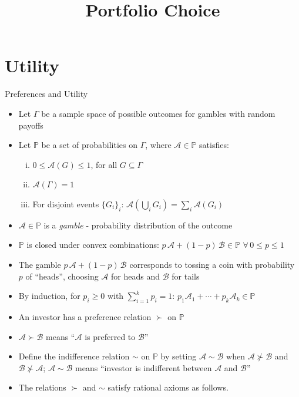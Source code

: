 \documentclass[10pt]{beamer}
\title{Portfolio Choice}
\author{}
\date{}
\theoremstyle{definition}
\begin{document}
\begin{frame}
\titlepage
\end{frame}


\section{Utility}

\begin{frame}{Preferences and Utility}
  \begin{itemize}[<+->]
    \item Let $\Gamma$ be a sample space of possible outcomes for gambles with random payoffs
    \item Let $\mathbb{P}$ be a set of probabilities on $\Gamma$, where $\mathcal{A} \in \mathbb{P}$ satisfies:
      \begin{enumerate}[(i)]
        \item $0 \leqslant \mathcal{A}(G) \leqslant 1$, for all $G \subseteq \Gamma$
        \item $\mathcal{A}(\Gamma) = 1$
        \item For disjoint events $\{G_i\}_i$: $\mathcal{A}\left(\bigcup_i G_i\right) = \sum_i \mathcal{A}(G_i)$
      \end{enumerate}
    \item $\mathcal{A} \in \mathbb{P}$ is a \emph{gamble} - probability distribution of the outcome
    \item $\mathbb{P}$ is closed under convex combinations: $p\,\mathcal{A} + (1-p)\,\mathcal{B} \in \mathbb{P}$ $\forall\,0 \leqslant p \leqslant 1$
    \item The gamble $p\,\mathcal{A} + (1-p)\,\mathcal{B}$ corresponds to tossing a coin with probability $p$ of ``heads'', choosing $\mathcal{A}$ for heads and $\mathcal{B}$ for tails
    \item By induction, for $p_i \geqslant 0$ with $\sum_{i=1}^k p_i = 1$: $p_1\mathcal{A}_1 + \cdots + p_k\mathcal{A}_k \in \mathbb{P}$
    \item An investor has a preference relation $\succ$ on $\mathbb{P}$
    \item $\mathcal{A} \succ \mathcal{B}$ means ``$\mathcal{A}$ is preferred to $\mathcal{B}$''
    \item Define the indifference relation $\sim$ on $\mathbb{P}$ by setting $\mathcal{A} \sim \mathcal{B}$ when $\mathcal{A} \not\succ \mathcal{B}$ and $\mathcal{B} \not\succ \mathcal{A}$; $\mathcal{A} \sim \mathcal{B}$ means ``investor is indifferent between $\mathcal{A}$ and $\mathcal{B}$''
    \item The relations $\succ$ and $\sim$ satisfy rational axioms as follows.
  \end{itemize}
\end{frame}
\end{document}
